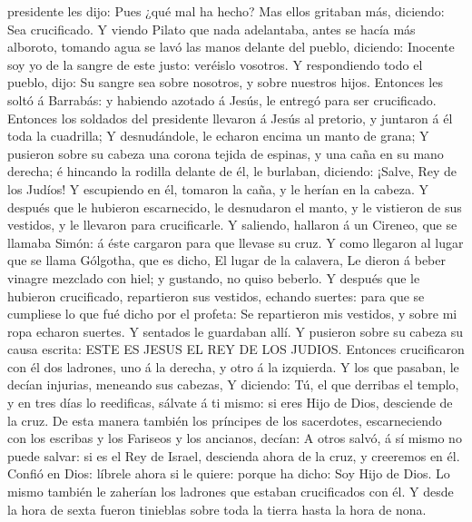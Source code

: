 presidente les dijo: Pues ¿qué mal ha hecho? Mas ellos gritaban más,
diciendo: Sea crucificado.  Y viendo Pilato que nada
adelantaba, antes se hacía más alboroto, tomando agua se lavó las manos
delante del pueblo, diciendo: Inocente soy yo de la sangre de este
justo: veréislo vosotros.  Y respondiendo todo el pueblo,
dijo: Su sangre sea sobre nosotros, y sobre nuestros hijos.
 Entonces les soltó á Barrabás: y habiendo azotado á Jesús,
le entregó para ser crucificado.  Entonces los soldados del
presidente llevaron á Jesús al pretorio, y juntaron á él toda la
cuadrilla;  Y desnudándole, le echaron encima un manto de
grana;  Y pusieron sobre su cabeza una corona tejida de
espinas, y una caña en su mano derecha; é hincando la rodilla delante de
él, le burlaban, diciendo: ¡Salve, Rey de los Judíos!  Y
escupiendo en él, tomaron la caña, y le herían en la cabeza.
 Y después que le hubieron escarnecido, le desnudaron el
manto, y le vistieron de sus vestidos, y le llevaron para crucificarle.
 Y saliendo, hallaron á un Cireneo, que se llamaba Simón: á
éste cargaron para que llevase su cruz.  Y como llegaron al
lugar que se llama Gólgotha, que es dicho, El lugar de la calavera,
 Le dieron á beber vinagre mezclado con hiel; y gustando,
no quiso beberlo.  Y después que le hubieron crucificado,
repartieron sus vestidos, echando suertes: para que se cumpliese lo que
fué dicho por el profeta: Se repartieron mis vestidos, y sobre mi ropa
echaron suertes.  Y sentados le guardaban allí.
 Y pusieron sobre su cabeza su causa escrita: ESTE ES JESUS
EL REY DE LOS JUDIOS.  Entonces crucificaron con él dos
ladrones, uno á la derecha, y otro á la izquierda.  Y los
que pasaban, le decían injurias, meneando sus cabezas,  Y
diciendo: Tú, el que derribas el templo, y en tres días lo reedificas,
sálvate á ti mismo: si eres Hijo de Dios, desciende de la cruz.
 De esta manera también los príncipes de los sacerdotes,
escarneciendo con los escribas y los Fariseos y los ancianos, decían:
 A otros salvó, á sí mismo no puede salvar: si es el Rey de
Israel, descienda ahora de la cruz, y creeremos en él. 
Confió en Dios: líbrele ahora si le quiere: porque ha dicho: Soy Hijo de
Dios.  Lo mismo también le zaherían los ladrones que
estaban crucificados con él.  Y desde la hora de sexta
fueron tinieblas sobre toda la tierra hasta la hora de nona.
